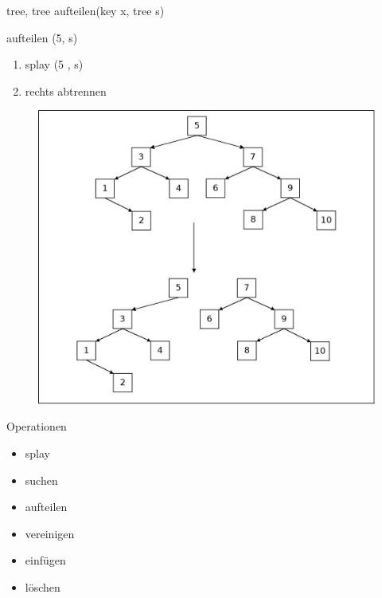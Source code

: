\documentclass[11pt]{beamer}
\begin{document}
	\begin{frame}{tree, tree aufteilen(key x, tree s)}
		\begin{block}{aufteilen (5, s)}
			\begin{enumerate}
				\item splay (5 ,  s)
				\item rechts abtrennen
			\end{enumerate}
		\end{block}	
		\begin{figure}[h]
			\centering
			\includegraphics[height=0.50\textwidth]{"bilder/aufteilen1"}	
		\end{figure}
		
	\end{frame}	

	\begin{frame}{Operationen}
		
		\begin{itemize}
			
			\item \color {gray} splay
			\item  suchen
			\item  aufteilen
			\item \color {black} vereinigen
			\item \color {gray} einfügen
			\item löschen
		\end{itemize}
	\end{frame}		
	
\end{document}
